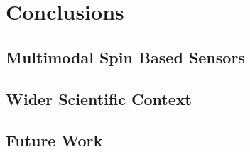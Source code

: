 \chapter{Conclusions}\label{ch:conclusions}

\section{Multimodal Spin Based Sensors}
\section{Wider Scientific Context}
\cite{Kraus2013}

\section{Future Work}
%
%
%
%
